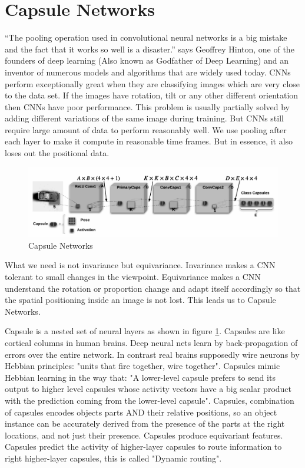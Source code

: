 \section{Capsule Networks} %
\label{sec:capsule_networks}
“The pooling operation used in convolutional neural networks is a big mistake and the fact that it works so well is a disaster.” says Geoffrey Hinton, one of the founders of deep learning (Also known as Godfather of Deep Learning) and an inventor of numerous models and algorithms that are widely used today. CNNs perform exceptionally great when they are classifying images which are very close to the data set. If the images have rotation, tilt or any other different orientation then CNNs have poor performance. This problem is usually partially solved by adding different variations of the same image during training. But CNNs still require large amount of data to perform reasonably well. We use pooling after each layer to make it compute in reasonable time frames. But in essence, it also loses out the positional data.\par\bigskip
\begin{figure}[H]
\centering\includegraphics[width=.7\textwidth]{images/caps.png}
\caption{Capsule Networks}
\label{fig:caps}
\end{figure}
What we need is not invariance but equivariance. Invariance makes a CNN tolerant to small changes in the viewpoint. Equivariance makes a CNN understand the rotation or proportion change and adapt itself accordingly so that the spatial positioning inside an image is not lost. This leads us to Capsule Networks.\par\bigskip
Capsule is a nested set of neural layers as shown in figure \ref{fig:caps}. Capsules are like cortical columns in human brains. Deep neural nets learn by back-propagation of errors over the entire network. In contrast real brains supposedly wire neurons by Hebbian principles: "units that fire together, wire together". Capsules mimic Hebbian learning in the way that: "A lower-level capsule prefers to send its output to higher level capsules whose activity vectors have a big scalar product with the prediction coming from the lower-level capsule". Capsules, combination of capsules encodes objects parts AND their relative positions, so an object instance can be accurately derived from the presence of the parts at the right locations, and not just their presence. Capsules produce equivariant features. Capsules predict the activity of higher-layer capsules to route information to right higher-layer capsules, this is called "Dynamic routing".

